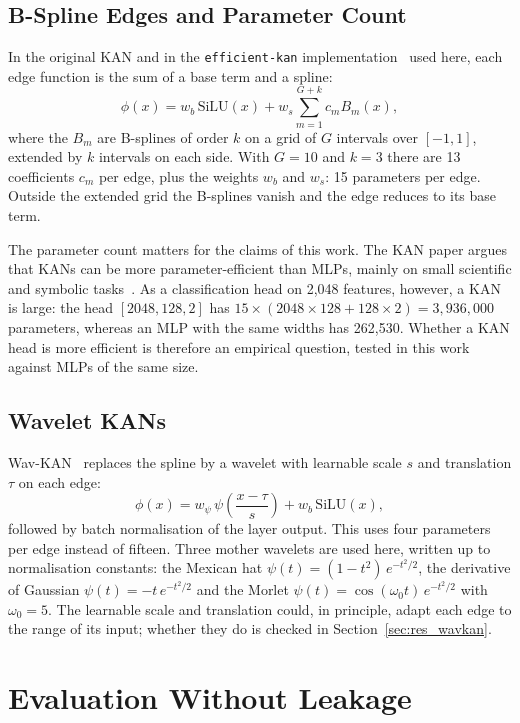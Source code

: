 \subsection{B-Spline Edges and Parameter Count}
In the original KAN and in the \texttt{efficient-kan} implementation~\cite{efficientkan} used here, each edge function is the sum of a base term and a spline:
\begin{equation}
\phi(x) = w_b\,\mathrm{SiLU}(x) + w_s \sum_{m=1}^{G+k} c_m B_m(x),
\end{equation}
where the $B_m$ are B-splines of order $k$ on a grid of $G$ intervals over $[-1, 1]$, extended by $k$ intervals on each side. With $G=10$ and $k=3$ there are 13 coefficients $c_m$ per edge, plus the weights $w_b$ and $w_s$: 15 parameters per edge. Outside the extended grid the B-splines vanish and the edge reduces to its base term.

The parameter count matters for the claims of this work. The KAN paper argues that KANs can be more parameter-efficient than MLPs, mainly on small scientific and symbolic tasks~\cite{liu2024kan}. As a classification head on 2,048 features, however, a KAN is large: the head $[2048, 128, 2]$ has $15 \times (2048 \times 128 + 128 \times 2) = 3{,}936{,}000$ parameters, whereas an MLP with the same widths has 262,530. Whether a KAN head is more efficient is therefore an empirical question, tested in this work against MLPs of the same size.

\subsection{Wavelet KANs}
Wav-KAN~\cite{bozorgasl2024wavkan} replaces the spline by a wavelet with learnable scale $s$ and translation $\tau$ on each edge:
\begin{equation}
\phi(x) = w_\psi\, \psi\!\left(\frac{x - \tau}{s}\right) + w_b\,\mathrm{SiLU}(x),
\end{equation}
followed by batch normalisation of the layer output. This uses four parameters per edge instead of fifteen. Three mother wavelets are used here, written up to normalisation constants: the Mexican hat $\psi(t) = (1 - t^2)\,e^{-t^2/2}$, the derivative of Gaussian $\psi(t) = -t\,e^{-t^2/2}$ and the Morlet $\psi(t) = \cos(\omega_0 t)\,e^{-t^2/2}$ with $\omega_0 = 5$. The learnable scale and translation could, in principle, adapt each edge to the range of its input; whether they do is checked in Section~\ref{sec:res_wavkan}.

\section{Evaluation Without Leakage}
\label{sec:leakage_background}

